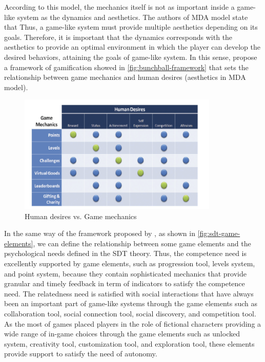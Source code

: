 According to this model, the mechanics itself is not as important inside a game-like system as the dynamics and aesthetics.
The authors of MDA model state that 
Thus, a game-like system must provide multiple aesthetics depending on its goals.
Therefore, it is important that the dynamics corresponds with the aesthetics to provide an optimal environment in which the player can develop the desired behaviors, attaining the goals of game-like system.
In this sense,  propose a framework of gamification showed in \autoref{fig:bunchball-framework} that sets the relationship between game mechanics and human desires (aesthetics in MDA model).

\begin{figure}[htb]
 \caption{Human desires vs. Game mechanics}
 \label{fig:bunchball-framework}
 \centering
 \includegraphics[width=0.85\textwidth]{images/chap-general-background/bunchball-framework.png}
\end{figure}


In the same way of the framework proposed by , as shown in \autoref{fig:sdt-game-elements}, we can define the relationship between some game elements and the psychological needs defined in the SDT theory.
Thus, the competence need is excellently supported by game elements, such as progression tool, levels system, and point system, because they contain sophisticated mechanics that provide granular and timely feedback in term of indicators to satisfy the competence need.
The relatedness need is satisfied with social interactions that have always been an important part of game-like systems through the game elements such as collaboration tool, social connection tool, social discovery, and competition tool.
As the most of games placed players in the role of fictional characters providing a wide range of in-game choices through the game elements such as unlocked system, creativity tool, customization tool, and exploration tool, these elements provide support to satisfy the need of autonomy.

